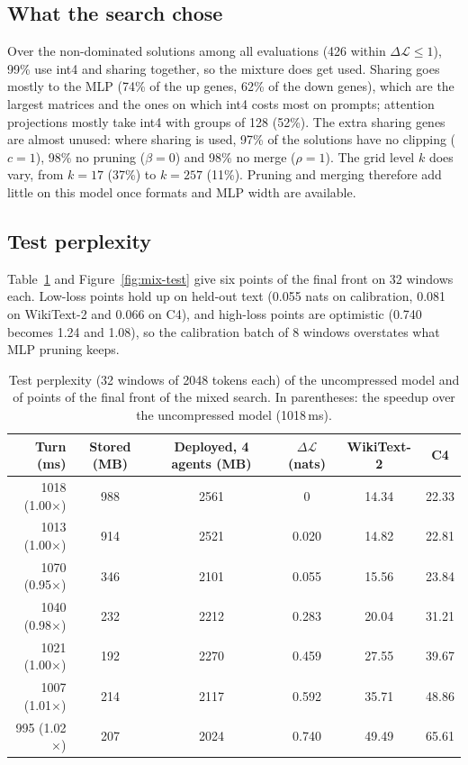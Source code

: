 \documentclass[11pt]{article}
\newcommand{\dloss}{\Delta\mathcal{L}}
\begin{document}
\subsection{What the search chose}
Over the non-dominated solutions among all evaluations (426 within $\dloss\le1$), 99\% use int4 and sharing
together, so the mixture does get used. Sharing goes mostly to the MLP (74\% of the up genes, 62\% of the
down genes), which are the largest matrices and the ones on which int4 costs most on prompts; attention
projections mostly take int4 with groups of 128 (52\%). The extra sharing genes are almost unused: where
sharing is used, 97\% of the solutions have no clipping ($c=1$), 98\% no pruning ($\beta=0$) and 98\% no
merge ($\rho=1$). The grid level $k$ does vary, from $k=17$ (37\%) to $k=257$ (11\%). Pruning and merging
therefore add little on this model once formats and MLP width are available.

\subsection{Test perplexity}
Table~\ref{tab:mix-test} and Figure~\ref{fig:mix-test} give six points of the final front on 32 windows each.
Low-loss points hold up on held-out text (0.055 nats on calibration, 0.081 on WikiText-2 and 0.066 on C4),
and high-loss points are optimistic (0.740 becomes 1.24 and 1.08), so the calibration batch of 8 windows
overstates what MLP pruning keeps.

\begin{table}[htbp]
\centering
\small
\begin{tabular}{rccccc}
\toprule
Turn (ms) & Stored (MB) & Deployed, 4 agents (MB) & $\dloss$ (nats) & WikiText-2 & C4 \\
\midrule
 1018 (1.00$\times$) & 988 & 2561 & 0     & 14.34 & 22.33 \\
\midrule
 1013 (1.00$\times$) & 914 & 2521 & 0.020 & 14.82 & 22.81 \\
 1070 (0.95$\times$) & 346 & 2101 & 0.055 & 15.56 & 23.84 \\
 1040 (0.98$\times$) & 232 & 2212 & 0.283 & 20.04 & 31.21 \\
 1021 (1.00$\times$) & 192 & 2270 & 0.459 & 27.55 & 39.67 \\
 1007 (1.01$\times$) & 214 & 2117 & 0.592 & 35.71 & 48.86 \\
 995 (1.02$\times$) & 207 & 2024 & 0.740 & 49.49 & 65.61 \\
\bottomrule
\end{tabular}
\caption{Test perplexity (32 windows of 2048 tokens each) of the uncompressed model and of points of the
final front of the mixed search. In parentheses: the speedup over the uncompressed model (1018\,ms).}
\label{tab:mix-test}
\end{table}
\end{document}
